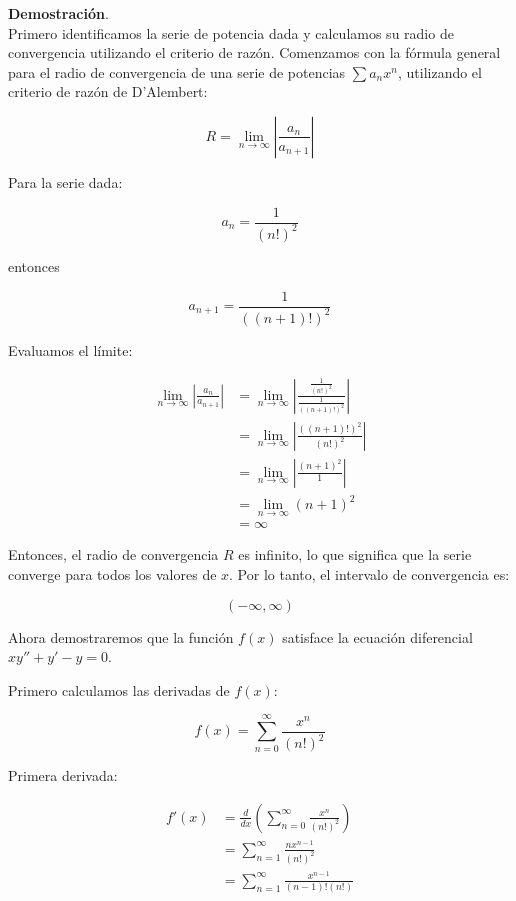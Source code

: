 \documentclass{article}
\begin{document}
    \textbf{Demostración}.\\

    Primero identificamos la serie de potencia dada y calculamos su radio de convergencia utilizando el criterio de razón. Comenzamos con la fórmula general para el radio de convergencia de una serie de potencias $\sum a_n x^n$, utilizando el criterio de razón de D'Alembert:

    \[
    R = \lim_{n \to \infty} \left| \frac{a_n}{a_{n+1}} \right|
    \]

    Para la serie dada:

    \[
    a_n = \frac{1}{(n!)^2}
    \]

    entonces

    \[
    a_{n+1} = \frac{1}{((n+1)!)^2}
    \]

    Evaluamos el límite:

    \begin{align*}
    \lim_{n \to \infty} \left| \frac{a_n}{a_{n+1}} \right| &= \lim_{n \to \infty} \left| \frac{\frac{1}{(n!)^2}}{\frac{1}{((n+1)!)^2}} \right| \\
    &= \lim_{n \to \infty} \left| \frac{((n+1)!)^2}{(n!)^2} \right| \\
    &= \lim_{n \to \infty} \left| \frac{(n+1)^2}{1} \right| \\
    &= \lim_{n \to \infty} (n+1)^2 \\
    &= \infty
    \end{align*}

    Entonces, el radio de convergencia $R$ es infinito, lo que significa que la serie converge para todos los valores de $x$. Por lo tanto, el intervalo de convergencia es:

    \[
    (-\infty, \infty)
    \]

    Ahora demostraremos que la función $f(x)$ satisface la ecuación diferencial $x y'' + y' - y = 0$.

    Primero calculamos las derivadas de $f(x)$:

    \[
    f(x) = \sum_{n=0}^{\infty} \frac{x^n}{(n!)^2}
    \]

    Primera derivada:

    \begin{align*}
    f'(x) &= \frac{d}{dx} \left( \sum_{n=0}^{\infty} \frac{x^n}{(n!)^2} \right) \\
    &= \sum_{n=1}^{\infty} \frac{n x^{n-1}}{(n!)^2} \\
    &= \sum_{n=1}^{\infty} \frac{x^{n-1}}{(n-1)!(n!)}
    \end{align*}
\end{document}
